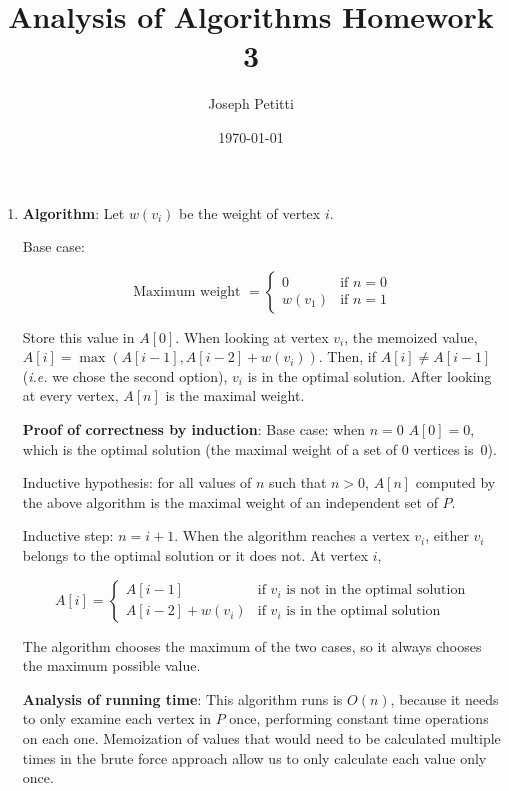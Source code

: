 \documentclass[a4paper, 10pt]{article}
\title{Analysis of Algorithms Homework 3}
\author{Joseph Petitti}
\date{\today}
\begin{document}
\maketitle

\begin{enumerate}
	\item \textbf{Algorithm}: Let $w(v_i)$ be the weight of vertex $i$.

		Base case:

		$$ \textrm{Maximum weight } =
		\begin{cases}
			0 & \textrm{if } n = 0 \\
			w(v_1) & \textrm{if } n = 1
		\end{cases} $$

		Store this value in $A[0]$. When looking at vertex $v_i$, the memoized
		value, $A[i] = \max ( A[i - 1], A[i - 2] + w(v_i))$. Then, if $A[i] \ne
		A[i - 1]$ (\textit{i.e.} we chose the second option), $v_i$ is in the
		optimal solution. After looking at every vertex, $A[n]$ is the maximal
		weight.

		\textbf{Proof of correctness by induction}: Base case: when $n = 0$
		$A[0] = 0$, which is the optimal solution (the maximal weight of a set
		of 0 vertices is~0).

		Inductive hypothesis: for all values of $n$ such that $n > 0$, $A[n]$
		computed by the above algorithm is the maximal weight of an independent
		set of $P$.

		Inductive step: $n = i + 1$. When the algorithm reaches a vertex $v_i$,
		either $v_i$ belongs to the optimal solution or it does not. At vertex
		$i$, 
		
		\[ A[i] =
		\begin{cases}
			A[i - 1] & \textrm{if } v_i \textrm{ is not in the optimal
				solution} \\
			A[i -2] + w(v_i) & \textrm{if } v_i \textrm{ is in the optimal
				solution}
		\end{cases} \]

		The algorithm chooses the maximum of the two cases, so it always chooses
		the maximum possible value.

		\textbf{Analysis of running time}: This algorithm runs is $O(n)$,
		because it needs to only examine each vertex in $P$ once, performing
		constant time operations on each one. Memoization of values that would
		need to be calculated multiple times in the brute force approach allow
		us to only calculate each value only once.

		\newpage


\end{enumerate}
\end{document}
